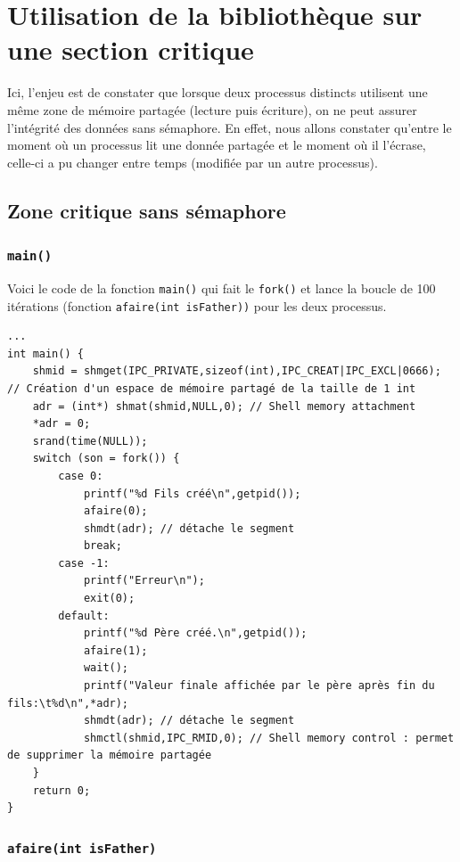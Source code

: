 \clanguage

\chapter{Utilisation de la bibliothèque sur une section critique}

Ici, l'enjeu est de constater que lorsque deux processus distincts utilisent une même zone de mémoire partagée (lecture puis écriture), on ne peut assurer l'intégrité des données sans sémaphore. En effet, nous allons constater qu'entre le moment où un processus lit une donnée partagée et le moment où il l'écrase, celle-ci a pu changer entre temps (modifiée par un autre processus).

\section{Zone critique sans sémaphore}

\subsection{\lstinline{main()}}

Voici le code de la fonction \lstinline{main()} qui fait le \lstinline{fork()} et lance la boucle de 100 itérations (fonction \lstinline{afaire(int isFather))} pour les deux processus.

\begin{lstlisting}
...
int main() {
    shmid = shmget(IPC_PRIVATE,sizeof(int),IPC_CREAT|IPC_EXCL|0666); // Création d'un espace de mémoire partagé de la taille de 1 int
    adr = (int*) shmat(shmid,NULL,0); // Shell memory attachment
    *adr = 0;
    srand(time(NULL));
    switch (son = fork()) {
        case 0:
            printf("%d Fils créé\n",getpid());
            afaire(0);
            shmdt(adr); // détache le segment
            break;
        case -1:
            printf("Erreur\n");
            exit(0);
        default:
            printf("%d Père créé.\n",getpid());
            afaire(1);
            wait();
            printf("Valeur finale affichée par le père après fin du fils:\t%d\n",*adr);
            shmdt(adr); // détache le segment
            shmctl(shmid,IPC_RMID,0); // Shell memory control : permet de supprimer la mémoire partagée
    }
    return 0;
}
\end{lstlisting}

\subsection{\lstinline{afaire(int isFather)}}


